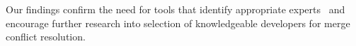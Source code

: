 Our findings confirm the need for tools that identify appropriate experts~\cite{CostaSarma} and encourage further research into selection of knowledgeable developers for merge conflict resolution.


%
%
%
%
